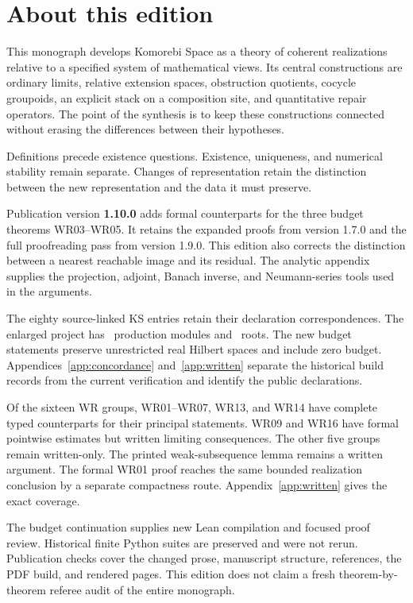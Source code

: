 \documentclass[11pt]{article}
\begin{document}
\KomorebiCover
{}
\section*{About this edition}
This monograph develops Komorebi Space as a theory of coherent realizations relative to a specified system of mathematical views. Its central constructions are ordinary limits, relative extension spaces, obstruction quotients, cocycle groupoids, an explicit stack on a composition site, and quantitative repair operators. The point of the synthesis is to keep these constructions connected without erasing the differences between their hypotheses.

Definitions precede existence questions. Existence, uniqueness, and numerical stability remain separate. Changes of representation retain the distinction between the new representation and the data it must preserve.

Publication version \textbf{1.10.0} adds formal counterparts for the three budget theorems WR03--WR05. It retains the expanded proofs from version 1.7.0 and the full proofreading pass from version 1.9.0. This edition also corrects the distinction between a nearest reachable image and its residual. The analytic appendix supplies the projection, adjoint, Banach inverse, and Neumann-series tools used in the arguments.

The eighty source-linked KS entries retain their declaration correspondences. The enlarged project has \EditionBudgetModules\ production modules and \EditionBudgetRoots\ roots. The new budget statements preserve unrestricted real Hilbert spaces and include zero budget. Appendices~\ref{app:concordance} and~\ref{app:written} separate the historical build records from the current verification and identify the public declarations.

Of the sixteen WR groups, WR01--WR07, WR13, and WR14 have complete typed counterparts for their principal statements. WR09 and WR16 have formal pointwise estimates but written limiting consequences. The other five groups remain written-only. The printed weak-subsequence lemma remains a written argument. The formal WR01 proof reaches the same bounded realization conclusion by a separate compactness route. Appendix~\ref{app:written} gives the exact coverage.

The budget continuation supplies new Lean compilation and focused proof review. Historical finite Python suites are preserved and were not rerun. Publication checks cover the changed prose, manuscript structure, references, the PDF build, and rendered pages. This edition does not claim a fresh theorem-by-theorem referee audit of the entire monograph.
\end{document}
